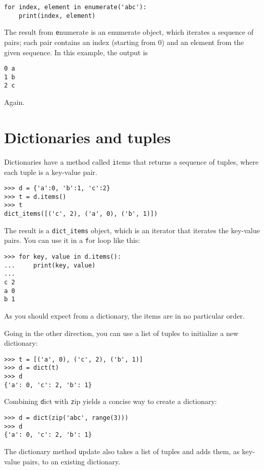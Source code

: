 \documentclass[
DIV=11,
fontsize=13,
twoside,
headinclude=false,
titlepage=firstiscover,
abstract=true,
headsepline=true,
footsepline=true,
chapterprefix=true, %
headings=big,
bibliography=totoc,%
captions=tableheading
]{scrbook}
\theoremstyle{definition}
\begin{document}
\begin{lstlisting}
for index, element in enumerate('abc'):
    print(index, element)
\end{lstlisting}
%
The result from {\texttt enumerate} is an enumerate object, which
iterates a sequence of pairs; each pair contains an index (starting
from 0) and an element from the given sequence.
In this example, the output is

\begin{lstlisting}
0 a
1 b
2 c
\end{lstlisting}
%
Again.


\section{Dictionaries and tuples}
\label{dictuple}

Dictionaries have a method called {\texttt items} that returns a sequence of
tuples, where each tuple is a key-value pair.

\begin{lstlisting}
>>> d = {'a':0, 'b':1, 'c':2}
>>> t = d.items()
>>> t
dict_items([('c', 2), ('a', 0), ('b', 1)])
\end{lstlisting}
%
The result is a \verb"dict_items" object, which is an iterator that
iterates the key-value pairs.  You can use it in a {\texttt for} loop
like this:

\begin{lstlisting}
>>> for key, value in d.items():
...     print(key, value)
...
c 2
a 0
b 1
\end{lstlisting}
%
As you should expect from a dictionary, the items are in no
particular order.

Going in the other direction, you can use a list of tuples to
initialize a new dictionary: 

\begin{lstlisting}
>>> t = [('a', 0), ('c', 2), ('b', 1)]
>>> d = dict(t)
>>> d
{'a': 0, 'c': 2, 'b': 1}
\end{lstlisting}

Combining {\texttt dict} with {\texttt zip} yields a concise way
to create a dictionary:

\begin{lstlisting}
>>> d = dict(zip('abc', range(3)))
>>> d
{'a': 0, 'c': 2, 'b': 1}
\end{lstlisting}
%
The dictionary method {\texttt update} also takes a list of tuples
and adds them, as key-value pairs, to an existing dictionary.
\end{document}
